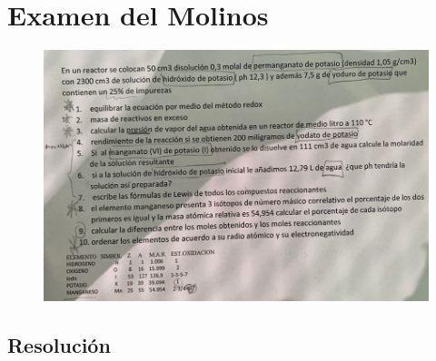 \section*{Examen del Molinos}

\begin{figure}[H]
    \centering
    \includegraphics[width=\linewidth]{Images/molinos_examen.png}
\end{figure}

\subsection*{Resolución}


